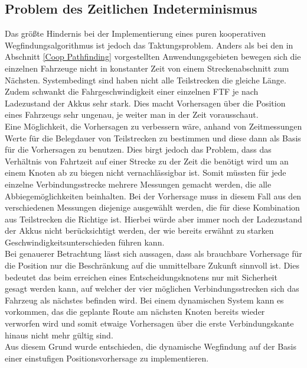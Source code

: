 	\subsection{Problem des Zeitlichen Indeterminismus}
		\label{Zeitproblem}
		Das größte Hindernis bei der Implementierung eines puren kooperativen Wegfindungsalgorithmus ist jedoch das Taktungsproblem. Anders als bei den in Abschnitt \ref{Coop Pathfinding} vorgestellten Anwendungsgebieten bewegen sich die einzelnen Fahrzeuge nicht in konstanter Zeit von einem Streckenabschnitt zum Nächsten. Systembedingt sind haben nicht alle Teilstrecken die gleiche Länge. Zudem schwankt die Fahrgeschwindigkeit einer einzelnen \ac{FTF} je nach Ladezustand der Akkus sehr stark. Dies macht Vorhersagen über die Position eines Fahrzeugs sehr ungenau, je weiter man in der Zeit vorausschaut.
		\\
		Eine Möglichkeit, die Vorhersagen zu verbessern wäre, anhand von Zeitmessungen Werte für die Belegdauer von Teilstrecken zu bestimmen und diese dann als Basis für die Vorhersagen zu benutzen. Dies birgt jedoch das Problem, dass das Verhältnis von Fahrtzeit auf einer Strecke zu der Zeit die benötigt wird um an einem Knoten ab zu biegen nicht vernachlässigbar ist. Somit müssten für jede einzelne Verbindungsstrecke mehrere Messungen gemacht werden, die alle Abbiegemöglichkeiten beinhalten. Bei der Vorhersage muss in diesem Fall aus den verschiedenen Messungen diejenige ausgewählt werden, die für diese Kombination aus Teilstrecken die Richtige ist. Hierbei würde aber immer noch der Ladezustand der Akkus nicht berücksichtigt werden, der wie bereits erwähnt zu starken Geschwindigkeitsunterschieden führen kann.
		\\
		Bei genauerer Betrachtung lässt sich aussagen, dass als brauchbare Vorhersage für die Position nur die Beschränkung auf die unmittelbare Zukunft sinnvoll ist. Dies bedeutet das beim erreichen eines Entscheidungsknotens nur mit Sicherheit gesagt werden kann, auf welcher der vier möglichen Verbindungsstrecken sich das Fahrzeug als nächstes befinden wird. Bei einem dynamischen System kann es vorkommen, das die geplante Route am nächsten Knoten bereits wieder verworfen wird und somit etwaige Vorhersagen über die erste Verbindungskante hinaus nicht mehr gültig sind.
		\\
		Aus diesem Grund wurde entschieden, die dynamische Wegfindung auf der Basis einer einstufigen Positionsvorhersage zu implementieren.
		
